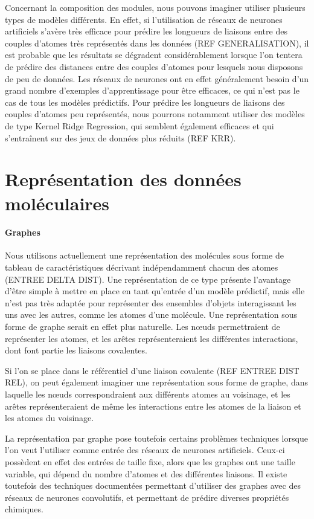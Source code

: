 \par Concernant la composition des modules, nous pouvons imaginer utiliser plusieurs types de modèles différents. En effet, si l'utilisation de réseaux de neurones artificiels s'avère très efficace pour prédire les longueurs de liaisons entre des couples d'atomes très représentés dans les données (REF GENERALISATION), il est probable que les résultats se dégradent considérablement lorsque l'on tentera de prédire des distances entre des couples d'atomes pour lesquels nous disposons de peu de données. Les réseaux de neurones ont en effet généralement besoin d'un grand nombre d'exemples d'apprentissage pour être efficaces, ce qui n'est pas le cas de tous les modèles prédictifs. Pour prédire les longueurs de liaisons des couples d'atomes peu représentés, nous pourrons notamment utiliser des modèles de type Kernel Ridge Regression, qui semblent également efficaces et qui s'entraînent sur des jeux de données plus réduits (REF KRR).\\


\section{Représentation des données moléculaires}
		
\paragraph{Graphes} Nous utilisons actuellement une représentation des molécules sous forme de tableau de caractéristiques décrivant indépendamment chacun des atomes (ENTREE DELTA DIST). Une représentation de ce type présente l'avantage d'être simple à mettre en place en tant qu'entrée d'un modèle prédictif, mais elle n'est pas très adaptée pour représenter des ensembles d'objets interagissant les uns avec les autres, comme les atomes d'une molécule. Une représentation sous forme de graphe serait en effet plus naturelle. Les nœuds permettraient de représenter les atomes, et les arêtes représenteraient les différentes interactions, dont font partie les liaisons covalentes.
\par Si l'on se place dans le référentiel d'une liaison covalente (REF ENTREE DIST REL), on peut également imaginer une représentation sous forme de graphe, dans laquelle les nœuds correspondraient aux différents atomes au voisinage, et les arêtes représenteraient de même les interactions entre les atomes de la liaison et les atomes du voisinage.

\par La représentation par graphe pose toutefois certains problèmes techniques lorsque l'on veut l'utiliser comme entrée des réseaux de neurones artificiels. Ceux-ci possèdent en effet des entrées de taille fixe, alors que les graphes ont une taille variable, qui dépend du nombre d'atomes et des différentes liaisons. Il existe toutefois des techniques documentées permettant d'utiliser des graphes avec des réseaux de neurones convolutifs\cite{mg}, et permettant de prédire diverses propriétés chimiques\cite{jctc_prediction}. 
